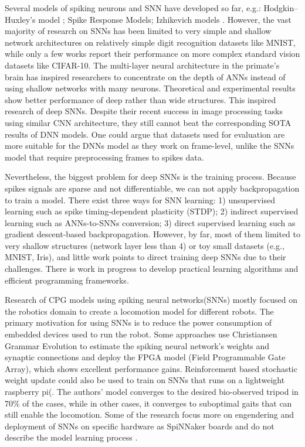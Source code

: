 \documentclass[runningheads]{llncs}
\begin{document}
Several models of spiking neurons and SNN have developed so far, e.g.: Hodgkin–Huxley’s model  \cite{ref16}; Spike Response Models\cite{ref17}\cite{ref18}; Izhikevich models \cite{ref19}. However, the vast majority of research on SNNs has been limited to very simple and shallow network architectures on relatively simple digit recognition datasets like MNIST, while only a few works report their performance on more complex standard vision datasets like CIFAR-10. The multi-layer neural architecture in the primate’s brain has inspired researchers to concentrate on the depth of ANNs instead of using shallow networks with many neurons. Theoretical and experimental results show better performance of deep rather than wide structures. This inspired research of deep SNNs. Despite their recent success in image processing tasks using similar CNN architecture, they still cannot beat the corresponding SOTA results of DNN models. One could argue that datasets used for evaluation are more suitable for the DNNs model as they work on frame-level, unlike the SNNs model that require preprocessing frames to spikes data.

Nevertheless, the biggest problem for deep SNNs is the training process. Because spikes signals are sparse and not differentiable, we can not apply backpropagation to train a model. There exist three ways for SNN learning: 1) unsupervised learning such as spike timing-dependent plasticity (STDP); 2) indirect supervised learning such as ANNs-to-SNNs conversion; 3) direct supervised learning such as gradient descent-based backpropagation. However, by far, most of them limited to very shallow structures (network layer less than 4) or toy small datasets (e.g., MNIST, Iris), and little work points to direct training deep SNNs due to their challenges. There is work in progress to develop practical learning algorithms and efficient programming frameworks.\cite{ref20}

Research of CPG models using spiking neural networks(SNNs) mostly focused on the robotics domain to create a locomotion model for different robots. The primary motivation for using SNNs is to reduce the power consumption of embedded devices used to run the robot. Some approaches use Christiansen Grammar Evolution to estimate the spiking neural network's weights and synaptic connections and deploy the FPGA model (Field Programmable Gate Array), which shows excellent performance gains.\cite{ref21} Reinforcement based stochastic weight update could also be used to train on SNNs that runs on a lightweight raspberry pi(\cite{ref22}. The authors' model converges to the desired bio-observed tripod in 70\% of the cases, while in other cases, it converges to suboptimal gaits that can still enable the locomotion. Some of the research focus more on engendering and deployment of SNNs on specific hardware as SpiNNaker boards and do not describe the model learning process \cite{ref23} \cite{ref24}.
\end{document}
